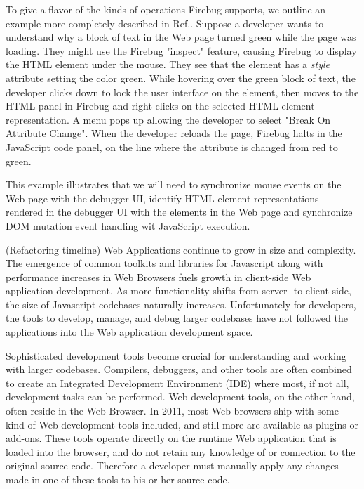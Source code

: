 To give a flavor of the kinds of operations Firebug supports, we outline  an
example more completely described in Ref.\cite{jjb-www2010}. Suppose a developer
wants to understand why a block of text in the Web page turned green while the
page was loading. They might use the Firebug "inspect" feature, causing Firebug
to display the HTML element under the mouse. They see that the element has a
\textit{style} attribute setting the color green. While hovering over the green
block of text, the developer clicks down to lock the user interface on the
element, then moves to the HTML panel in Firebug and right clicks on the
selected HTML element representation. A menu pops up allowing the developer to
select "Break On Attribute Change". When the developer reloads the page, Firebug
halts in the JavaScript code panel, on the line where the attribute is changed
from red to green.

This example illustrates that we will need to synchronize mouse events on the
Web page with the debugger UI, identify HTML element representations rendered in
the debugger UI with the elements in the Web page and synchronize DOM mutation
event handling wit JavaScript execution.


(Refactoring timeline)
Web Applications continue to grow in size and complexity. The
emergence of common toolkits and libraries for Javascript along with performance
increases in Web Browsers fuels growth in client-side Web application
development. As more functionality shifts from server- to client-side, the size
of Javascript codebases naturally increases. Unfortunately for developers, the
tools to develop, manage, and debug larger codebases have not followed the
applications into the Web application development space.

Sophisticated development tools become crucial for understanding
and working with larger codebases. Compilers, debuggers, and other tools are
often combined to create an Integrated Development Environment (IDE) where
most, if not all, development tasks can be performed. Web development tools, on
the other hand, often reside in the Web Browser. In 2011, most Web
browsers ship with some kind of Web development tools included\cite{something},
and still more are available as plugins or add-ons. These tools operate
directly on the runtime Web application that is loaded into the browser, and do
not retain any knowledge of or connection to the original source code. Therefore
a developer must manually apply any changes made in one of these tools to his or
her source code.


